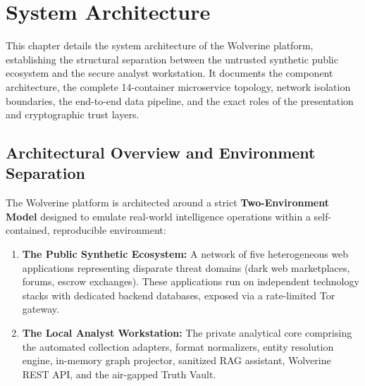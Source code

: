 \chapter{System Architecture}
\label{ch:system-architecture}

This chapter details the system architecture of the Wolverine platform, establishing the structural separation between the untrusted synthetic public ecosystem and the secure analyst workstation. It documents the component architecture, the complete 14-container microservice topology, network isolation boundaries, the end-to-end data pipeline, and the exact roles of the presentation and cryptographic trust layers.

\section{Architectural Overview and Environment Separation}
\label{sec:arch-overview}
The Wolverine platform is architected around a strict \textbf{Two-Environment Model} designed to emulate real-world intelligence operations within a self-contained, reproducible environment:

\begin{enumerate}
    \item \textbf{The Public Synthetic Ecosystem:} A network of five heterogeneous web applications representing disparate threat domains (dark web marketplaces, forums, escrow exchanges). These applications run on independent technology stacks with dedicated backend databases, exposed via a rate-limited Tor gateway.
    \item \textbf{The Local Analyst Workstation:} The private analytical core comprising the automated collection adapters, format normalizers, entity resolution engine, in-memory graph projector, sanitized RAG assistant, Wolverine REST API, and the air-gapped Truth Vault.
\end{enumerate}

